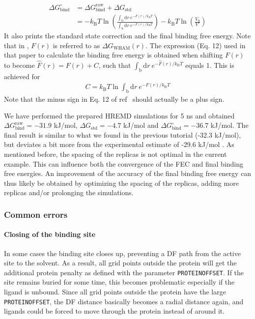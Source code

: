 \begin{equation}
  \begin{aligned}
    \Delta G_{\text{bind}}^{\circ} & = \Delta G_{\text{bind}}^{\text{raw}} + \Delta G_{\text{std}}  \\
                            & = -k_{\text{B}} T \ln \left ( \frac{\int_{\text{b}} \mathrm{d}r\: e^{-F(r)/k_{\text{B}} T}}{\int_{\text{u}} \mathrm{d}r\: e^{-F(r)/k_{\text{B}} T}} \right ) -k_{\text{B}} T \ln \left( \frac{V_{\text{u}}}{V^{\circ}} \right )
  \end{aligned}
\end{equation}
%
It also prints the standard state correction and the final binding free energy. 
Note that in \cite{deRuiter_2013}, $F(r)$ is referred to as $\Delta G_{\text{WHAM}}(r)$. The expression (Eq. 12) used in that paper to calculate the binding free energy is obtained when shifting $F(r)$ to become $\hat{F}(r) = F(r) + C$, such that $\int_{\text{b}} \mathrm{d}r\: e^{-\hat{F}(r)/k_{\text{B}} T}$ equals 1. This is achieved for 
\begin{equation}
  \begin{aligned}
    C = k_{\text{B}}T \ln \int_{\text{b}} \mathrm{d}r\: e^{-F(r)/k_{\text{B}} T}
  \end{aligned}
\end{equation}
Note that the minus sign in Eq. 12 of ref~\cite{deRuiter_2013} should actually be a plus sign.

We have performed the prepared HREMD simulations for 5 ns and obtained $\Delta G^{\text{raw}}_{\text{bind}}=-31.9$ kJ/mol, $\Delta G_{\text{std}}=-4.7$ kJ/mol and $\Delta G^{\circ}_{\text{bind}}=-36.7$ kJ/mol. The final result is similar to what we found in the previous tutorial (-32.3 kJ/mol), but deviates a bit more from the experimental estimate of -29.6 kJ/mol \cite{Singh2005}.
As mentioned before, the spacing of the replicas is not optimal in the current example. 
This can influence both the convergence of the FEC and final binding free energies.
An improvement of the accuracy of the final binding free energy can thus likely be obtained by optimizing the spacing of the replicas, adding more replicas and/or prolonging the simulations.

\subsubsection{Common errors}

\paragraph{Closing of the binding site}
In some cases the binding site closes up, preventing a DF path from the active site to the solvent. As a result, all grid points outside the protein will get the additional protein penalty as defined with the parameter \texttt{PROTEINOFFSET}. If the site remains buried for some time, this becomes problematic especially if the ligand is unbound. Since all grid points outside the protein have the large \texttt{PROTEINOFFSET}, the DF distance basically becomes a radial distance again, and ligands could be forced to move through the protein instead of around it.

